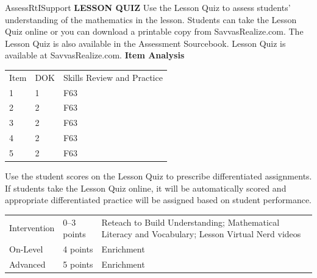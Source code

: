 \documentclass{article}
\newenvironment{te-addendum}[2]{}{}     %
\begin{document}
\begin{te-addendum}{Assess}{RtISupport}
\textbf{LESSON QUIZ}
Use the Lesson Quiz to assess students' understanding of the mathematics in the lesson.
Students can take the Lesson Quiz online or you can download a printable copy from SavvasRealize.com. The Lesson Quiz is also available in the Assessment Sourcebook.
Lesson Quiz is available at SavvasRealize.com.
\textbf{Item Analysis}
\begin{tabular}{lll}
Item & DOK & Skills Review and Practice \\
1 & 1 & F63 \\
2 & 2 & F63 \\
3 & 2 & F63 \\
4 & 2 & F63 \\
5 & 2 & F63 \\
\end{tabular}
Use the student scores on the Lesson Quiz to prescribe differentiated assignments.
If students take the Lesson Quiz online, it will be automatically scored and appropriate differentiated practice will be assigned based on student performance.
\begin{tabular}{lll}
Intervention & 0--3 points & Reteach to Build Understanding; Mathematical Literacy and Vocabulary; Lesson Virtual Nerd videos \\
On-Level & 4 points & Enrichment \\
Advanced & 5 points & Enrichment \\
\end{tabular}
\end{te-addendum}
\end{document}
